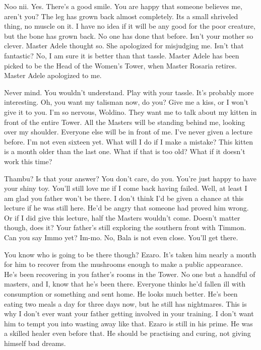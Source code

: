 \documentclass{article}
\begin{document}
Noo nii. Yes. There's a good smile. You are happy that someone believes me, aren't you? The leg has grown back almost completely. Its a small shriveled thing, no muscle on it. I have no idea if it will be any good for the poor creature, but the bone has grown back. No one has done that before. Isn't your mother so clever. Master Adele thought so. She apologized for misjudging me. Isn't that fantastic? No, I am sure it is better than that tassle. Master Adele has been picked to be the Head of the Women's Tower, when Master Rosaria retires. Master Adele apologized to me.

Never mind. You wouldn't understand. Play with your tassle. It's probably more interesting. Oh, you want my talisman now, do you? Give me a kiss, or I won't give it to you. I'm so nervous, Woldino. They want me to talk about my kitten in front of the entire Tower. All the Masters will be standing behind me, looking over my shoulder. Everyone else will be in front of me. I've never given a lecture before. I'm not even sixteen yet. What will I do if I make a mistake? This kitten is a month older than the last one. What if that is too old? What if it doesn't work this time?

Thambu? Is that your answer? You don't care, do you. You're just happy to have your shiny toy. You'll still love me if I come back having failed. Well, at least I am glad you father won't be there. I don't think I'd be given a chance at this lecture if he was still here. He'd be angry that someone had proved him wrong. Or if I did give this lecture, half the Masters wouldn't come. Doesn't matter though, does it? Your father's still exploring the southern front with Timmon. Can you say Immo yet? Im-mo. No, Bala is not even close. You'll get there. 

You know who is going to be there though? Ezaro. It's taken him nearly a month for him to recover from the mushrooms enough to make a public appearance. He's been recovering in you father's rooms in the Tower. No one but a handful of masters, and I, know that he's been there. Everyone thinks he'd fallen ill with consumption or something and sent home. He looks much better. He's been eating two meals a day for three days now, but he still has nightmares. This is why I don't ever want your father getting involved in your training. I don't want him to tempt you into wasting away like that. Ezaro is still in his prime. He was a skilled healer even before that. He should be practising and curing, not giving himself bad dreams.
\end{document}

